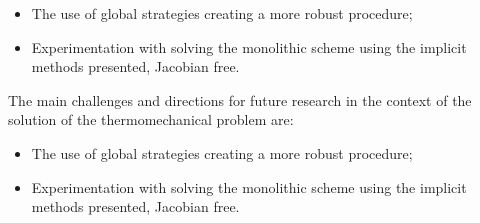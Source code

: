 \begin{itemize}
  \item The use of global strategies creating a more robust procedure;
  \item Experimentation with solving the monolithic scheme using the implicit methods presented, Jacobian free.
\end{itemize}
The main challenges and directions for future research in the context of the solution of the thermomechanical problem are:
\begin{itemize}
  \item The use of global strategies creating a more robust procedure;
  \item Experimentation with solving the monolithic scheme using the implicit methods presented, Jacobian free.
\end{itemize}
